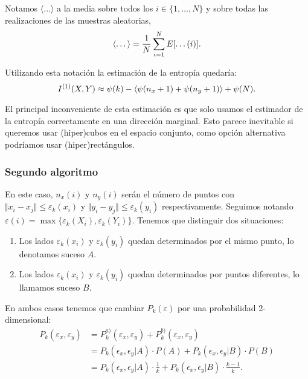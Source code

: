 \documentclass[12pt,a4paper]{report} %
\let\mathbb\relax
\theoremstyle{definition}
\begin{document}
Notamos $\langle \dots \rangle$ a la media sobre todos los $i\in\{1,\dots,N\}$ y sobre todas las realizaciones de las muestras aleatorias,\[
\langle \dots \rangle = \frac{1}{N} \sum_{i=1}^N\mathbb{E}[\dots(i)].
\]

Utilizando esta notación la estimación de la entropía quedaría:\[
I^{(1)}(X,Y) \approx \psi(k) - \langle \psi(n_x+1) + \psi(n_y+1) \rangle + \psi(N).\\
\]

El principal inconveniente de esta estimación es que solo usamos el estimador de la entropía correctamente en una dirección marginal. Esto parece inevitable si queremos usar (hiper)cubos en el espacio conjunto, como opción alternativa podríamos usar (hiper)rectángulos.\\

\subsubsection{Segundo algoritmo}

En este caso, $n_x(i)$ y $n_y(i)$ serán el número de puntos con $\Vert x_i - x_j \Vert \leq \varepsilon_k(x_i)$ y $\Vert y_i - y_j \Vert \leq \varepsilon_k(y_i)$ respectivamente. Seguimos notando $\varepsilon(i) = \max \{\varepsilon_k(X_i), \varepsilon_k(Y_i)\}$. Tenemos que distinguir dos situaciones:

\begin{enumerate}[label={\alph*)}]
\item Los lados $\varepsilon_k(x_i)$ y $\varepsilon_k(y_i)$ quedan determinados por el mismo punto, lo denotamos suceso $A$.
\item Los lados $\varepsilon_k(x_i)$ y $\varepsilon_k(y_i)$ quedan determinados por puntos diferentes, lo llamamos suceso $B$.
\end{enumerate}

En ambos casos tenemos que cambiar $P_k(\varepsilon)$ por una probabilidad 2-dimensional:
\begin{align*}
  P_k(\varepsilon_x, \varepsilon_y) &= P_k^{a)}(\varepsilon_x, \varepsilon_y) + P_k^{b)}(\varepsilon_x, \varepsilon_y)\\[3pt] &= P_k\left (\epsilon_x, \epsilon_y | A \right) \cdot P (A) + P_k\left (\epsilon_x, \epsilon_y | B \right) \cdot P(B)\\
  &= P_k\left (\epsilon_x, \epsilon_y | A \right) \cdot \frac{1}{k} + P_k\left (\epsilon_x, \epsilon_y | B \right) \cdot \frac{k-1}{k}.\\[-5pt]
\end{align*}
\end{document}
